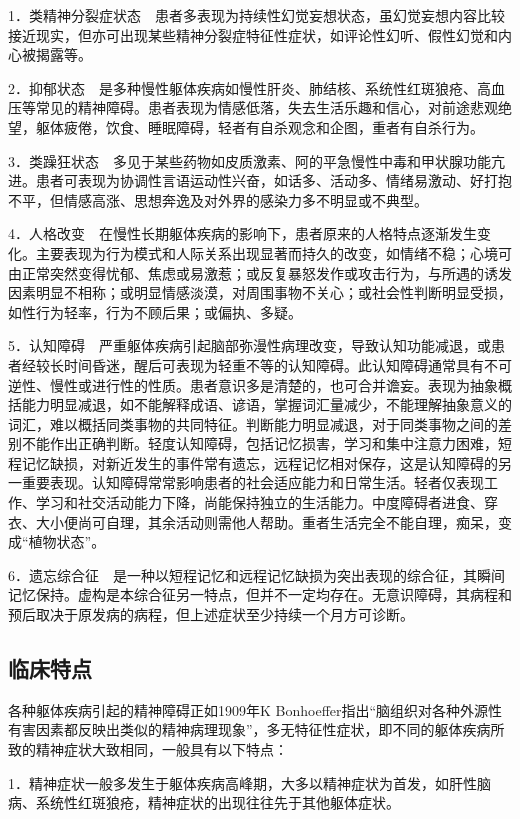 1．类精神分裂症状态　患者多表现为持续性幻觉妄想状态，虽幻觉妄想内容比较接近现实，但亦可出现某些精神分裂症特征性症状，如评论性幻听、假性幻觉和内心被揭露等。

2．抑郁状态　是多种慢性躯体疾病如慢性肝炎、肺结核、系统性红斑狼疮、高血压等常见的精神障碍。患者表现为情感低落，失去生活乐趣和信心，对前途悲观绝望，躯体疲倦，饮食、睡眠障碍，轻者有自杀观念和企图，重者有自杀行为。

3．类躁狂状态　多见于某些药物如皮质激素、阿的平急慢性中毒和甲状腺功能亢进。患者可表现为协调性言语运动性兴奋，如话多、活动多、情绪易激动、好打抱不平，但情感高涨、思想奔逸及对外界的感染力多不明显或不典型。

4．人格改变　在慢性长期躯体疾病的影响下，患者原来的人格特点逐渐发生变化。主要表现为行为模式和人际关系出现显著而持久的改变，如情绪不稳；心境可由正常突然变得忧郁、焦虑或易激惹；或反复暴怒发作或攻击行为，与所遇的诱发因素明显不相称；或明显情感淡漠，对周围事物不关心；或社会性判断明显受损，如性行为轻率，行为不顾后果；或偏执、多疑。

5．认知障碍　严重躯体疾病引起脑部弥漫性病理改变，导致认知功能减退，或患者经较长时间昏迷，醒后可表现为轻重不等的认知障碍。此认知障碍通常具有不可逆性、慢性或进行性的性质。患者意识多是清楚的，也可合并谵妄。表现为抽象概括能力明显减退，如不能解释成语、谚语，掌握词汇量减少，不能理解抽象意义的词汇，难以概括同类事物的共同特征。判断能力明显减退，对于同类事物之间的差别不能作出正确判断。轻度认知障碍，包括记忆损害，学习和集中注意力困难，短程记忆缺损，对新近发生的事件常有遗忘，远程记忆相对保存，这是认知障碍的另一重要表现。认知障碍常常影响患者的社会适应能力和日常生活。轻者仅表现工作、学习和社交活动能力下降，尚能保持独立的生活能力。中度障碍者进食、穿衣、大小便尚可自理，其余活动则需他人帮助。重者生活完全不能自理，痴呆，变成“植物状态”。

6．遗忘综合征　是一种以短程记忆和远程记忆缺损为突出表现的综合征，其瞬间记忆保持。虚构是本综合征另一特点，但并不一定均存在。无意识障碍，其病程和预后取决于原发病的病程，但上述症状至少持续一个月方可诊断。

\subsection{临床特点}

各种躯体疾病引起的精神障碍正如1909年K
Bonhoeffer指出“脑组织对各种外源性有害因素都反映出类似的精神病理现象”，多无特征性症状，即不同的躯体疾病所致的精神症状大致相同，一般具有以下特点：

1．精神症状一般多发生于躯体疾病高峰期，大多以精神症状为首发，如肝性脑病、系统性红斑狼疮，精神症状的出现往往先于其他躯体症状。

